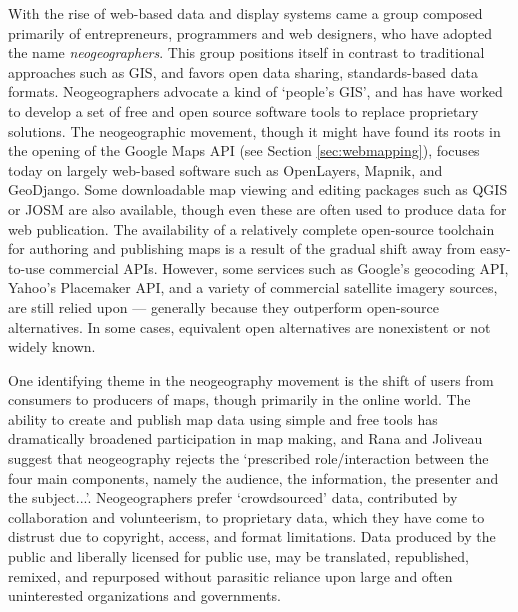 \documentclass[11pt]{report}
\begin{document}
With the rise of web-based data and display systems came a group composed primarily of entrepreneurs, programmers and web designers, who have adopted the name \emph{neogeographers}. This group positions itself in contrast to traditional approaches such as GIS, and favors open data sharing, standards-based data formats. Neogeographers advocate a kind of `people's GIS', and has have worked to develop a set of free and open source software tools to replace proprietary solutions. The neogeographic movement, though it might have found its roots in the opening of the Google Maps API (see Section \ref{sec:webmapping}), focuses today on largely web-based software such as OpenLayers, Mapnik, and GeoDjango. Some downloadable map viewing and editing packages such as QGIS or JOSM are also available, though even these are often used to produce data for web publication. The availability of a relatively complete open-source toolchain for authoring and publishing maps is a result of the gradual shift away from easy-to-use commercial APIs. \cite{rana2009neogeography} However, some services such as Google's geocoding API, Yahoo's Placemaker API, and a variety of commercial satellite imagery sources, are still relied upon --- generally because they outperform open-source alternatives. In some cases, equivalent open alternatives are nonexistent or not widely known.

One identifying theme in the neogeography movement is the shift of users from consumers to producers of maps, though primarily in the online world. \cite{oconnor2008maps} The ability to create and publish map data using simple and free tools has dramatically broadened participation in map making, and Rana and Joliveau suggest that neogeography rejects the `prescribed role/interaction between the four main components, namely the audience, the information, the presenter and the subject...'. \cite{rana2009neogeography} Neogeographers prefer `crowdsourced' data, contributed by collaboration and volunteerism, to proprietary data, which they have come to distrust due to copyright, access, and format limitations. Data produced by the public and liberally licensed for public use, may be translated, republished, remixed, and repurposed without parasitic reliance upon large and often uninterested organizations and governments. 
\end{document}

